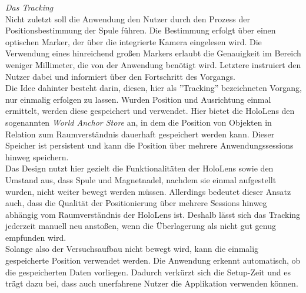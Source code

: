 \textit{Das Tracking}\\
Nicht zuletzt soll die Anwendung den Nutzer durch den Prozess der Positionsbestimmung der Spule führen. Die Bestimmung erfolgt über einen optischen Marker, der über die integrierte Kamera eingelesen wird. Die Verwendung eines hinreichend großen Markers erlaubt die Genauigkeit im Bereich weniger Millimeter, die von der Anwendung benötigt wird. Letztere instruiert den Nutzer dabei und informiert über den Fortschritt des Vorgangs.\\
\noindent\hspace*{5mm}
Die Idee dahinter besteht darin, diesen, hier als ''Tracking'' bezeichneten Vorgang, nur einmalig erfolgen zu lassen. Wurden Position und Ausrichtung einmal ermittelt, werden diese gespeichert und verwendet. Hier bietet die HoloLens den sogenannten \textit{World Anchor Store} an, in dem die Position von Objekten in Relation zum Raumverständnis dauerhaft gespeichert werden kann. Dieser Speicher ist persistent und kann die Position über mehrere Anwendungssessions hinweg speichern.\\
 

Das Design nutzt hier gezielt die Funktionalitäten der HoloLens sowie den Umstand aus, dass Spule und Magnetnadel, nachdem sie einmal aufgestellt wurden, nicht weiter bewegt werden müssen. Allerdings bedeutet dieser Ansatz auch, dass die Qualität der Positionierung über mehrere Sessions hinweg abhängig vom Raumverständnis der HoloLens ist. Deshalb lässt sich das Tracking jederzeit manuell neu anstoßen, wenn die Überlagerung als nicht gut genug empfunden wird.\\

Solange also der Versuchsaufbau nicht bewegt wird, kann die einmalig gespeicherte Position verwendet werden. Die Anwendung erkennt automatisch, ob die gespeicherten Daten vorliegen. Dadurch verkürzt sich die Setup-Zeit und es trägt dazu bei, dass auch unerfahrene Nutzer die Applikation verwenden können.

\vspace{8px}
\begin{center}
	\\
\end{center}
\vspace{6px}

